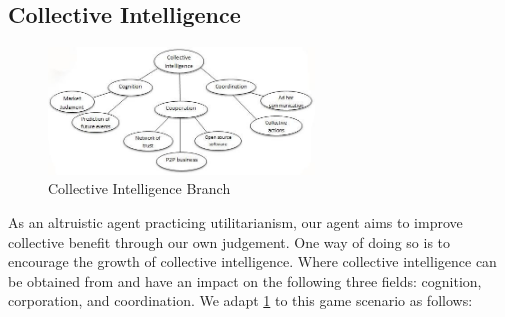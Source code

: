\subsection{Collective Intelligence}

\begin{figure}[h]
    \centering
    \includegraphics[width=0.63\textwidth]{008_team_5_agent_design/images/Collective-Intelligence-Branches.jpg}
    \caption{Collective Intelligence Branch}
    \label{fig:CQ}
\end{figure}
\begin{flushleft}
\setlength{\parindent}{2em}
As an altruistic agent practicing utilitarianism, our agent aims to improve collective benefit through our own judgement. One way of doing so is to encourage the growth of collective intelligence. Where collective intelligence can be obtained from and have an impact on the following three fields: cognition, corporation, and coordination. We adapt \ref{fig:CQ} \cite{rescher1966} to this game scenario as follows:
\end{flushleft}

